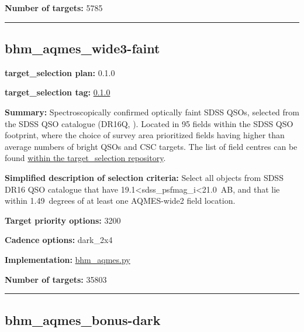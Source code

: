 \noindent\textbf{Number of targets:} 5785

\begin{center}\rule{0.5\linewidth}{0.5pt}\end{center}

\hypertarget{bhm_aqmes_wide3-faint_plan0.1.0}{%
\subsection{bhm\_aqmes\_wide3-faint}\label{bhm_aqmes_wide3-faint_plan0.1.0}}

\noindent\textbf{target\_selection plan:} 0.1.0

\noindent\textbf{target\_selection tag:}
\href{https://github.com/sdss/target_selection/tree/0.1.0/}{0.1.0}

\noindent\textbf{Summary:} Spectroscopically confirmed optically faint SDSS QSOs,
selected from the SDSS QSO catalogue (DR16Q,
\citealt{Lyke2020}). Located in 95 fields within the SDSS QSO footprint,
where the choice of survey area prioritized fields having higher than
average numbers of bright QSOs and CSC targets. The list of field
centres can be found
\href{https://github.com/sdss/target_selection/blob/0.1.0/python/target_selection/masks/candidate_target_fields_bhm_aqmes_wide_v0.2.1.fits}{within
the target\_selection repository}.

\noindent\textbf{Simplified description of selection criteria:} Select all
objects from SDSS DR16 QSO catalogue that have
19.1\textless sdss\_psfmag\_i\textless21.0~AB, and that lie within
1.49~degrees of at least one AQMES-wide2 field location.


\noindent\textbf{Target priority options:} 3200

\noindent\textbf{Cadence options:} dark\_2x4

\noindent\textbf{Implementation:}
\href{https://github.com/sdss/target_selection/blob/0.1.0/python/target_selection/cartons/bhm_aqmes.py}{bhm\_aqmes.py}

\noindent\textbf{Number of targets:} 35803

\begin{center}\rule{0.5\linewidth}{0.5pt}\end{center}

\hypertarget{bhm_aqmes_bonus-dark_plan0.1.0}{%
\subsection{bhm\_aqmes\_bonus-dark}\label{bhm_aqmes_bonus-dark_plan0.1.0}}

